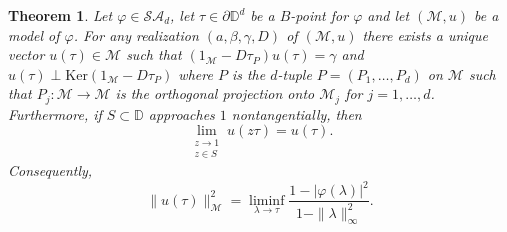 \documentclass[11pt, reqno]{amsart}
\newtheorem{theorem}{Theorem}[section]
\newcommand\1{\boldsymbol {1}}
\numberwithin{equation}{section}
\begin{document}
\begin{theorem}\label{theorem5.12cara}
Let $\varphi\in\mathcal{SA}_{d}$, let $\tau\in\partial\mathbb{D}^{d}$ be a $B$-point for $\varphi$ and let $(\mathcal{M},u)$ be a model of $\varphi$. For any realization $(a,\beta,\gamma, D)$ of $(\mathcal{M},u)$ there exists a unique vector $u(\tau)\in\mathcal{M}$ such that $(1_{\mathcal{M}}-D\tau_{P})u(\tau)=\gamma$ and $u(\tau)\perp\mathrm{Ker}(1_{\mathcal{M}}-D\tau_{P})$ where $P$ is the $d$-tuple $P=(P_{1},\hdots,P_{d})$ on $\mathcal{M}$ such that $P_{j}:\mathcal{M}\rightarrow\mathcal{M}$ is the orthogonal projection onto $\mathcal{M}_{j}$ for $j=1,\hdots,d$. Furthermore, if $S\subset \mathbb{D}$ approaches $1$ nontangentially, then
\begin{equation}\label{limitequationin5.12} 
\lim_{\substack{z\rightarrow 1 \\ z\in S}}u(z\tau)=u(\tau).
\end{equation}
Consequently, 
\begin{equation}\label{thisequationforliminf}
\|u(\tau)\|_{\mathcal{M}}^{2}=\liminf_{\lambda\rightarrow \tau}\dfrac{1-\lvert \varphi(\lambda) \rvert^{2}}{1-\|\lambda\|^{2}_{\infty}}.
\end{equation}
\end{theorem}
\end{document}
